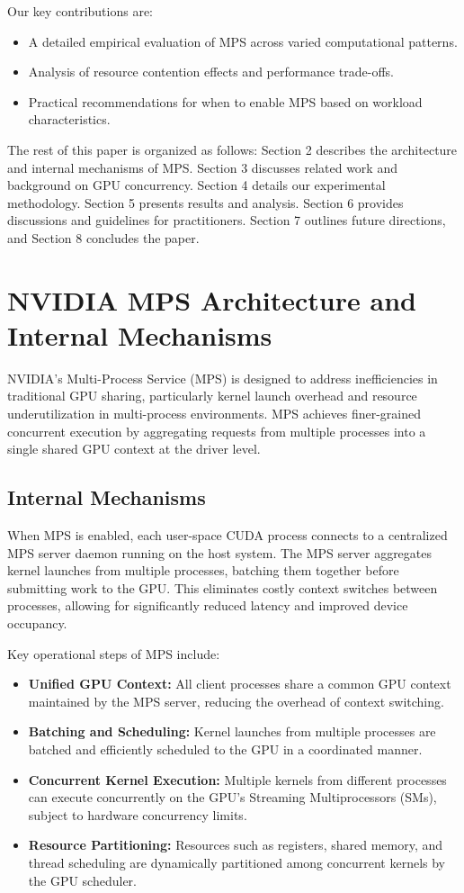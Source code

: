 \documentclass[sigconf,nonacm]{acmart}
\begin{document}
Our key contributions are:
\begin{itemize}
    \item A detailed empirical evaluation of MPS across varied computational patterns.
    \item Analysis of resource contention effects and performance trade-offs.
    \item Practical recommendations for when to enable MPS based on workload characteristics.
\end{itemize}

The rest of this paper is organized as follows: Section 2 describes the architecture and internal mechanisms of MPS. Section 3 discusses related work and background on GPU concurrency. Section 4 details our experimental methodology. Section 5 presents results and analysis. Section 6 provides discussions and guidelines for practitioners. Section 7 outlines future directions, and Section 8 concludes the paper.

\section{NVIDIA MPS Architecture and Internal Mechanisms}

NVIDIA’s Multi-Process Service (MPS) is designed to address inefficiencies in traditional GPU sharing, particularly kernel launch overhead and resource underutilization in multi-process environments. MPS achieves finer-grained concurrent execution by aggregating requests from multiple processes into a single shared GPU context at the driver level.

\subsection{Internal Mechanisms}

When MPS is enabled, each user-space CUDA process connects to a centralized MPS server daemon running on the host system. The MPS server aggregates kernel launches from multiple processes, batching them together before submitting work to the GPU. This eliminates costly context switches between processes, allowing for significantly reduced latency and improved device occupancy.

Key operational steps of MPS include:
\begin{itemize}
    \item \textbf{Unified GPU Context:} All client processes share a common GPU context maintained by the MPS server, reducing the overhead of context switching.
    \item \textbf{Batching and Scheduling:} Kernel launches from multiple processes are batched and efficiently scheduled to the GPU in a coordinated manner.
    \item \textbf{Concurrent Kernel Execution:} Multiple kernels from different processes can execute concurrently on the GPU’s Streaming Multiprocessors (SMs), subject to hardware concurrency limits.
    \item \textbf{Resource Partitioning:} Resources such as registers, shared memory, and thread scheduling are dynamically partitioned among concurrent kernels by the GPU scheduler.
\end{itemize}
\end{document}
